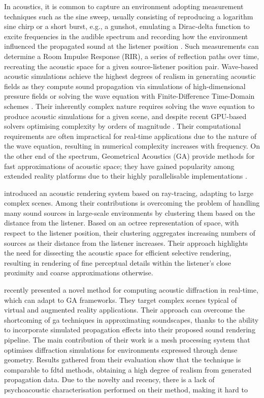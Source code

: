 In acoustics, it is common to capture an environment adopting measurement techniques such as the sine sweep, usually consisting of reproducing a logarithm sine chirp or a short burst, e.g., a gunshot,  emulating a Dirac-delta function to excite frequencies in the audible spectrum and recording how the environment influenced the propagated sound at the listener position \cite{reilly1995convolution}. Such measurements can determine a Room Impulse Response (RIR), a series of reflection paths over time, recreating the acoustic space for a given source-listener position pair. Wave-based acoustic simulations achieve the highest degrees of realism in generating acoustic fields as they compute sound propagation via simulations of high-dimensional pressure fields \cite{raghuvanshi2014parametric} or solving the wave equation with Finite-Difference Time-Domain schemes \cite{hamilton2017fdtd}. Their inherently complex nature requires solving the wave equation to produce acoustic simulations for a given scene, and despite recent GPU-based solvers optimising complexity by orders of magnitude \cite{mehra2012efficient}. Their computational requirements are often impractical for real-time applications due to the nature of the wave equation, resulting in numerical complexity increases with frequency. On the other end of the spectrum, Geometrical Acoustics (GA) provide methods for fast approximations of acoustic space; they have gained popularity among extended reality platforms due to their highly parallelisable implementations \cite{savioja2015overview}.\par
\cite{schissler2016interactive} introduced an acoustic rendering system based on ray-tracing, adapting to large complex scenes. Among their contributions is overcoming the problem of handling many sound sources in large-scale environments by clustering them based on the distance from the listener. Based on an octree representation of space, with respect to the listener position, their clustering aggregates increasing numbers of sources as their distance from the listener increases. Their approach highlights the need for dissecting the acoustic space for efficient selective rendering, resulting in rendering of fine perceptual details within the listener's close proximity and coarse approximations otherwise.\par

\cite{schissler2021fast} recently presented a novel method for computing acoustic diffraction in real-time, which can adapt to GA frameworks. They target complex scenes typical of virtual and augmented reality applications. Their approach can overcome the shortcoming of \acrshort{ga} techniques in approximating soundscapes, thanks to the ability to incorporate simulated propagation effects into their proposed sound rendering pipeline. The main contribution of their work is a mesh processing system that optimises diffraction simulations for environments expressed through dense geometry. Results gathered from their evaluation show that the technique is comparable to \acrshort{fdtd} methods, obtaining a high degree of realism from generated propagation data. Due to the novelty and recency, there is a lack of psychoacoustic characterisation performed on their method, making it hard to \par

